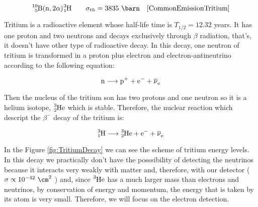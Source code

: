 
\begin{equation}
\ce{^{10}_{5}B}(\ce{n},2\alpha)\ce{^{3}_{1}H} \qquad \sigma_{th}= 3835~\barn ~~~\cite{CommonEmissionTritium}
\label{eq:capneuB10}
\end{equation}





Tritium is a radioactive element whose half-life time is $T_{1/2}= 12.32$ years. It has one proton and two neutrons and decays exclusively through $\beta$ radiation, that's, it doesn't have other type of radioactive decay. In this decay, one neutron of tritium is transformed in a proton plus electron and electron-antineutrino according to the following equation:

\begin{equation}
\ce{n} \longrightarrow \ce{p^+}  + \ce{e^-}  + \ce{\overline{\nu}_e}
\label{eq:BetaDecay}
\end{equation}

Then the nucleus of the tritium son has two protons and one neutron so it is a helium isotope, $\ce{^{3}_{2}He}$ which is stable. Therefore, the nuclear reaction which descript the $\beta^-$ decay of the tritium is:

\begin{equation}
\ce{^{3}_{1}H} \longrightarrow \ce{^{3}_{2}He}  + \ce{e^-}  + \ce{\overline{\nu}_e}
\label{eq:TritiumDecay}
\end{equation}

In the Figure \ref{fig:TritiumDecay} we can see the scheme of tritium energy levels. In this decay we practically don't have the posssibility of detecting the neutrinos because it interacts very weakly with matter and, therefore, with our detector ($\sigma \propto 10^{-42} ~ \cm^2$ \cite{CrossSeccionNeutrino}) and, since $\ce{^{3}He}$ has a much larger mass than electrons and neutrinos, by conservation of energy and momentum, the energy that is taken by its atom is very small. Therefore, we will focus on the electron detection. 

